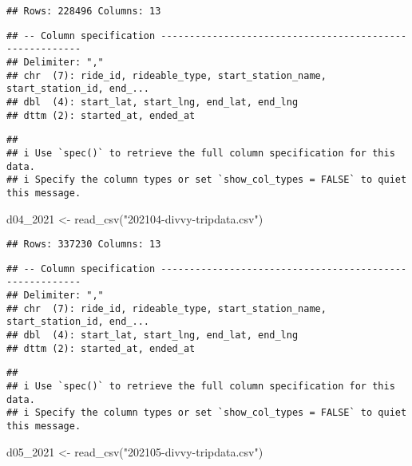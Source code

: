 \documentclass[
]{article}
\newenvironment{Shaded}{\begin{snugshade}}{\end{snugshade}}
\newcommand{\FunctionTok}[1]{\textcolor[rgb]{0.00,0.00,0.00}{#1}}
\newcommand{\NormalTok}[1]{#1}
\newcommand{\OtherTok}[1]{\textcolor[rgb]{0.56,0.35,0.01}{#1}}
\newcommand{\StringTok}[1]{\textcolor[rgb]{0.31,0.60,0.02}{#1}}
\begin{document}
\begin{verbatim}
## Rows: 228496 Columns: 13
\end{verbatim}

\begin{verbatim}
## -- Column specification --------------------------------------------------------
## Delimiter: ","
## chr  (7): ride_id, rideable_type, start_station_name, start_station_id, end_...
## dbl  (4): start_lat, start_lng, end_lat, end_lng
## dttm (2): started_at, ended_at
\end{verbatim}

\begin{verbatim}
## 
## i Use `spec()` to retrieve the full column specification for this data.
## i Specify the column types or set `show_col_types = FALSE` to quiet this message.
\end{verbatim}

\begin{Shaded}
\begin{Highlighting}[]
\NormalTok{d04\_2021 }\OtherTok{\textless{}{-}} \FunctionTok{read\_csv}\NormalTok{(}\StringTok{"202104{-}divvy{-}tripdata.csv"}\NormalTok{)}
\end{Highlighting}
\end{Shaded}

\begin{verbatim}
## Rows: 337230 Columns: 13
\end{verbatim}

\begin{verbatim}
## -- Column specification --------------------------------------------------------
## Delimiter: ","
## chr  (7): ride_id, rideable_type, start_station_name, start_station_id, end_...
## dbl  (4): start_lat, start_lng, end_lat, end_lng
## dttm (2): started_at, ended_at
\end{verbatim}

\begin{verbatim}
## 
## i Use `spec()` to retrieve the full column specification for this data.
## i Specify the column types or set `show_col_types = FALSE` to quiet this message.
\end{verbatim}

\begin{Shaded}
\begin{Highlighting}[]
\NormalTok{d05\_2021 }\OtherTok{\textless{}{-}} \FunctionTok{read\_csv}\NormalTok{(}\StringTok{"202105{-}divvy{-}tripdata.csv"}\NormalTok{)}
\end{Highlighting}
\end{Shaded}
\end{document}
